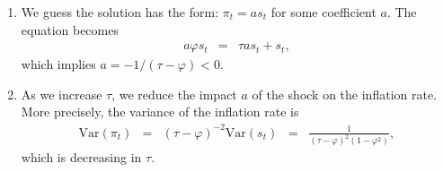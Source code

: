 \documentclass[11pt]{article}
\begin{document}
\begin{enumerate}
\begin{enumerate}
\item We guess the solution has the form:  $\pi_t = a s_t $ for some coefficient $a$.
The equation becomes
\begin{eqnarray*}
    a \varphi s_t  &=& \tau a s_t + s_t ,
\end{eqnarray*}
which implies $ a = -1/(\tau-\varphi) < 0$.

\item As we increase $\tau$, we reduce the impact $a$ of the shock on the inflation rate.
More precisely, the variance of the inflation rate is
\begin{eqnarray*}
    \mbox{Var}(\pi_t) &=& (\tau-\varphi)^{-2} \mbox{Var}(s_t)
                \;\;=\;\; \frac{1} {(\tau-\varphi)^{2} (1-\varphi^2)} ,
\end{eqnarray*}
which is decreasing in $\tau$.

\end{enumerate}



\end{enumerate}
\end{document}
